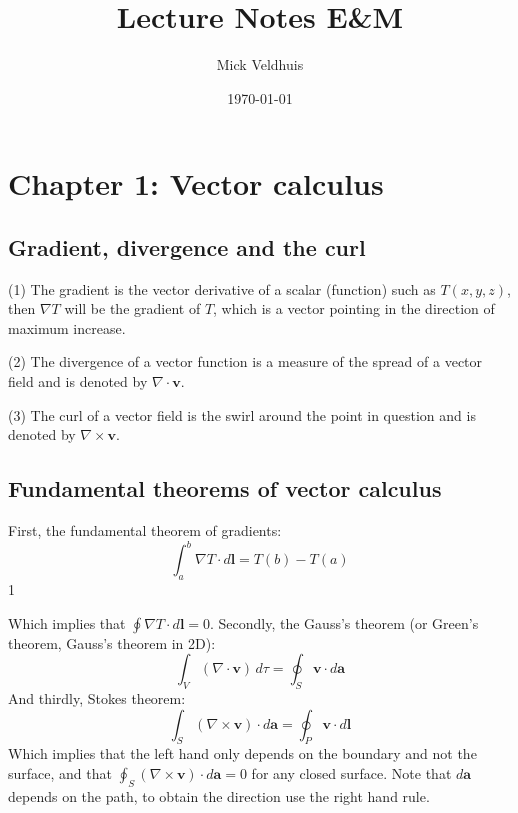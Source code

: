 \documentclass[a4paper]{article}
\title{Lecture Notes E\&M}
\author{Mick Veldhuis}
\date{\today}
\begin{document}
\maketitle

\tableofcontents

\section{Chapter 1: Vector calculus}

\subsection{Gradient, divergence and the curl}
(1) The gradient is the vector derivative of a scalar (function) such as $T(x, y, z)$, then $\nabla T$ will be the gradient of $T$, which is a vector pointing in the direction of maximum increase.

\bigskip

(2) The divergence of a vector function is a measure of the spread of a vector field and is denoted by $\nabla \cdot \bm{v}$.

\bigskip

(3) The curl of a vector field is the swirl around the point in question and is denoted by $\nabla \times \bm{v}$.

\subsection{Fundamental theorems of vector calculus}
First, the fundamental theorem of gradients:
\begin{equation}
    \int_{a}^{b} \nabla T\cdot d\bm{l} = T(b) - T(a)
\end{equation}1

Which implies that $\oint \nabla T\cdot d\bm{l}=0$. Secondly, the Gauss's theorem (or Green's theorem, Gauss's theorem in 2D):
\begin{equation}
    \int_V (\nabla \cdot \bm{v}) \,d\tau = \oint_S \bm{v} \cdot d\bm{a}
\end{equation}
And thirdly, Stokes theorem:
\begin{equation}
    \int_S (\nabla \times \bm{v}) \cdot d\bm{a} = \oint_P \bm{v}\cdot d\bm{l}
\end{equation}
Which implies that the left hand only depends on the boundary and not the surface, and that $\oint_S (\nabla \times \bm{v}) \cdot d\bm{a}=0$ for any closed surface. Note that $d\bm{a}$ depends on the path, to obtain the direction use the right hand rule.
\end{document}
